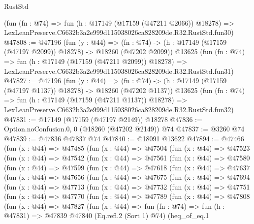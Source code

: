 \begin{lexlean}{RustStd}
\begin{coremodule}
    (fun (fn : @74) =>
    fun (h : @17149 (@17159 (@47211 @2066)) @18278) =>
    LexLeanPreserve.C6632b3a2e999d115038026ca828209de.R32.RustStd.fun30)
@47808 := @47196
    (fun (y : @44) =>
    (fn : @74) -> (h : @17149 (@17159 (@47197 @2099)) @18278) -> @18260 (@47202 @2099))
    @13625
    (fun (fn : @74) =>
    fun (h : @17149 (@17159 (@47211 @2099)) @18278) =>
    LexLeanPreserve.C6632b3a2e999d115038026ca828209de.R32.RustStd.fun31)
@47827 := @47196
    (fun (y : @44) =>
    (fn : @74) -> (h : @17149 (@17159 (@47197 @1137)) @18278) -> @18260 (@47202 @1137))
    @13625
    (fun (fn : @74) =>
    fun (h : @17149 (@17159 (@47211 @1137)) @18278) =>
    LexLeanPreserve.C6632b3a2e999d115038026ca828209de.R32.RustStd.fun32)
@47831 := @17149 (@17159 (@47197 @2149)) @18278
@47836 := Option.noConfusion.{0, 0} (@18260 (@47202 @2149)) @74
@47837 := @3260 @74
@47839 := @47836 @47837 @74
@47840 := @18091 @13622
@47894 := @47466
    (fun (x : @44) =>
    @47485
      (fun (x : @44) =>
      @47504
        (fun (x : @44) =>
        @47523
          (fun (x : @44) =>
          @47542
            (fun (x : @44) =>
            @47561
              (fun (x : @44) =>
              @47580
                (fun (x : @44) =>
                @47599
                  (fun (x : @44) =>
                  @47618
                    (fun (x : @44) =>
                    @47637
                      (fun (x : @44) =>
                      @47656
                        (fun (x : @44) =>
                        @47675
                          (fun (x : @44) =>
                          @47694
                            (fun (x : @44) =>
                            @47713
                              (fun (x : @44) =>
                              @47732
                                (fun (x : @44) =>
                                @47751
                                  (fun (x : @44) =>
                                  @47770
                                    (fun (x : @44) =>
                                    @47789
                                      (fun (x : @44) =>
                                      @47808
                                        (fun (x : @44) =>
                                        @47827
                                          (fun (x : @44) =>
                                          fun (fn : @74) =>
                                          fun (h : @47831) =>
                                          @47839
                                            @47840
                                            (Eq.refl.{2} (Sort 1) @74)
                                            (heq_of_eq.{1}

\end{coremodule}
\end{lexlean}
